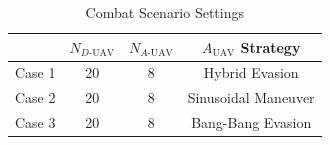 \documentclass[lettersize,journal]{IEEEtran}
\newcommand{\hladd}[1]{{\color{blue}#1}}
\begin{document}
\begin{table}[!t]
\centering
\renewcommand{\arraystretch}{1.4}
\caption{Combat Scenario Settings}
\label{changjingqingkuang}
\begin{tabular}{cccc}
\hline\hline
 & $N_{D\text{-UAV}}$ & $N_{A\text{-UAV}}$ & $A_{\text{UAV}}$ Strategy \\ \hline
Case 1 & 20 & 8 & Hybrid Evasion \\
Case 2 & 20 & 8 & Sinusoidal Maneuver \\
\hladd{Case 3} & \hladd{20} & \hladd{8} & \hladd{Bang-Bang Evasion} \\ \hline
\end{tabular}
\end{table}

\end{document}
